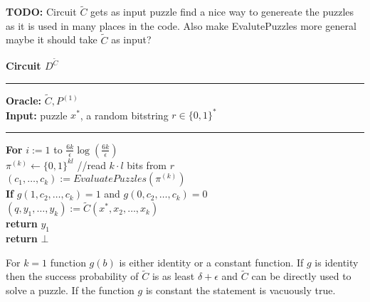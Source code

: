 %
%
%
\begin{todo}
  \textbf{TODO:} Circuit $\widetilde{C}$ gets as input puzzle find a nice way to genereate the puzzles as it is used in many places in the code.
   Also make EvalutePuzzles more general maybe it should take $\widetilde{C}$ as input?
\end{todo}
\begin{codeblock}
  \textbf{Circuit $D^{\widetilde{C}}$}
  \medskip

  \hrule

  \medskip

  \textbf{Oracle:}  $\widetilde{C}, P^{(1)}$\\
  \textbf{Input:}  puzzle $x^*$, a random bitstring $r \in \{0,1\}^{*}$

  \medskip\hrule\medskip
  \textbf{For} $i:=1$ to $\frac{6k}{\epsilon} \log(\frac{6k}{\epsilon})$\\
  \IndI $\pi^{(k)} \leftarrow \{0,1\}^{kl}$ //read $k \cdot l$ bits from $r$  \\
  \IndI $(c_1, \dots, c_k) := EvaluatePuzzles(\pi^{(k)})$\\
  \IndI \textbf{If} $g(1,c_2, \dots, c_k) = 1$ and $g(0,c_2, \dots, c_k) = 0$\\
  \IndII $(q, y_1, \dots, y_k) := \widetilde{C}(x^*, x_2, \dots, x_k)$\\
  \IndII \textbf{return} $y_1$\\
  \textbf{return} $\bot$ \\

\end{codeblock}
%
%
For $k=1$ function $g(b)$ is either identity or a constant function.
If $g$ is identity then the success probability of $\widetilde{C}$ is as least $\delta + \epsilon$
and $\widetilde{C}$ can be directly used to solve a puzzle. If the function $g$ is constant the statement is vacuously true.


